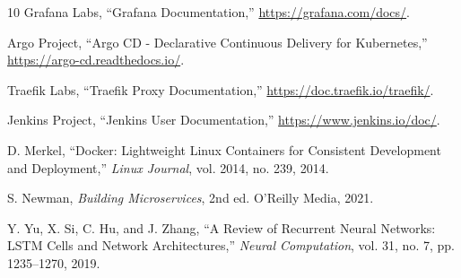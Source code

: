 \documentclass[journal]{IEEEtran}
\begin{document}
\begin{thebibliography}{10}
Grafana Labs, ``Grafana Documentation,'' \url{https://grafana.com/docs/}.

Argo Project, ``Argo CD - Declarative Continuous Delivery for Kubernetes,'' \url{https://argo-cd.readthedocs.io/}.

Traefik Labs, ``Traefik Proxy Documentation,'' \url{https://doc.traefik.io/traefik/}.

Jenkins Project, ``Jenkins User Documentation,'' \url{https://www.jenkins.io/doc/}.

D. Merkel, ``Docker: Lightweight Linux Containers for Consistent Development and Deployment,'' \textit{Linux Journal}, vol. 2014, no. 239, 2014.

S. Newman, \textit{Building Microservices}, 2nd ed. O'Reilly Media, 2021.

Y. Yu, X. Si, C. Hu, and J. Zhang, ``A Review of Recurrent Neural Networks: LSTM Cells and Network Architectures,'' \textit{Neural Computation}, vol. 31, no. 7, pp. 1235--1270, 2019.

\end{thebibliography}
\end{document}
